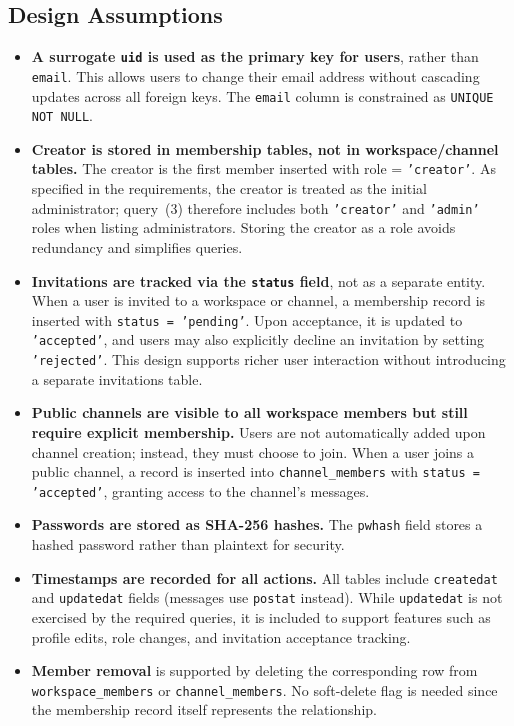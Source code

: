 \documentclass[11pt]{article}
\begin{document}
\subsection{Design Assumptions}

\begin{itemize}
\item \textbf{A surrogate \texttt{uid} is used as the primary key for users}, rather than \texttt{email}. This allows users to change their email address without cascading updates across all foreign keys. The \texttt{email} column is constrained as \texttt{UNIQUE NOT NULL}.
\item \textbf{Creator is stored in membership tables, not in workspace/channel tables.} The creator is the first member inserted with role = \texttt{'creator'}. As specified in the requirements, the creator is treated as the initial administrator; query~(3) therefore includes both \texttt{'creator'} and \texttt{'admin'} roles when listing administrators. Storing the creator as a role avoids redundancy and simplifies queries.
\item \textbf{Invitations are tracked via the \texttt{status} field}, not as a separate entity. When a user is invited to a workspace or channel, a membership record is inserted with \texttt{status = 'pending'}. Upon acceptance, it is updated to \texttt{'accepted'}, and users may also explicitly decline an invitation by setting \texttt{'rejected'}. This design supports richer user interaction without introducing a separate invitations table.
\item \textbf{Public channels are visible to all workspace members but still require explicit membership.} Users are not automatically added upon channel creation; instead, they must choose to join. When a user joins a public channel, a record is inserted into \texttt{channel\_members} with \texttt{status = 'accepted'}, granting access to the channel's messages.
\item \textbf{Passwords are stored as SHA-256 hashes.} The \texttt{pwhash} field stores a hashed password rather than plaintext for security.
\item \textbf{Timestamps are recorded for all actions.} All tables include \texttt{createdat} and \texttt{updatedat} fields (messages use \texttt{postat} instead). While \texttt{updatedat} is not exercised by the required queries, it is included to support features such as profile edits, role changes, and invitation acceptance tracking.
\item \textbf{Member removal} is supported by deleting the corresponding row from \texttt{workspace\_members} or \texttt{channel\_members}. No soft-delete flag is needed since the membership record itself represents the relationship.

\end{itemize}
\end{document}
